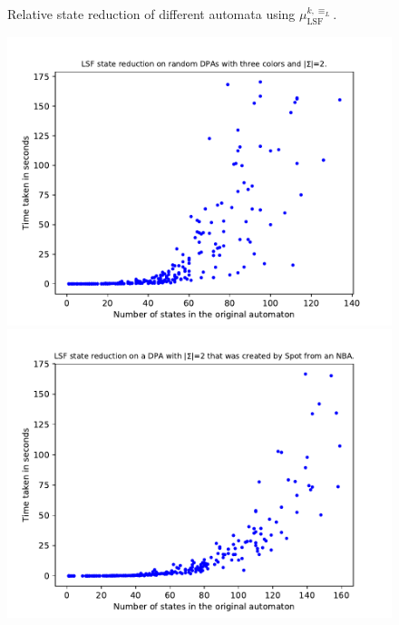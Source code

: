 \begin{figure}
\begin{minipage}{0.49\textwidth}
		\caption{Relative state reduction of different automata using $\mu_\text{LSF}^{k,\equiv_L}$.}
		\label{fig:lsf:empirical_reduct_rel}
	\end{minipage}
\end{figure}


\begin{figure}
	\centering
	\begin{minipage}{0.49\textwidth}
		\includegraphics[page=1,height=.3\textheight]{../data/analysis/lsf/gendet_ap1.pdf} 
		\includegraphics[page=1,height=.3\textheight]{../data/analysis/lsf/detspot_ap1.pdf} 

\end{minipage}
\end{figure}
